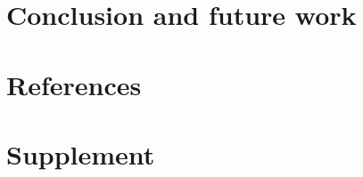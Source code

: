\documentclass[review]{siamart0216}
\begin{document}


\section{Conclusion and future work}



\section{References}




\section{Supplement}


\end{document}
